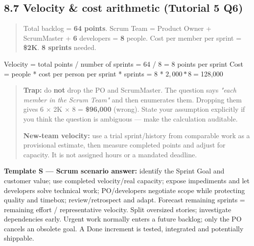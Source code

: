 \begin{studycolumns}
\vspace{0pt}

\subsection*{8.7 Velocity \& cost arithmetic (Tutorial 5 Q6)}

\begin{quote}\small\color{navy}
Total backlog = \textbf{64 points}. Scrum Team = Product Owner + ScrumMaster + \textbf{6} developers = \textbf{8} people. Cost per member per sprint = \textbf{\$2K}. \textbf{8 sprints} needed.

\end{quote}

\begin{ReferenceCode}
Velocity  = total points / number of sprints = 64 / 8 = 8 points per sprint
Cost      = people * cost per person per sprint * sprints
          = 8 * $2,000 * 8 = $128,000
\end{ReferenceCode}

\begin{quote}\small\color{navy}
\textbf{Trap:} do \textbf{not} drop the PO and ScrumMaster. The question says \emph{"each member in the Scrum Team"} and then enumerates them. Dropping them gives 6 \ensuremath{\times} 2K \ensuremath{\times} 8 = \textbf{\$96,000} (wrong). State your assumption explicitly if you think the question is ambiguous --- make the calculation auditable.

\textbf{New-team velocity:} use a trial sprint/\allowbreak{}history from comparable work as a provisional estimate, then measure completed points and adjust for capacity. It is not assigned hours or a mandated deadline.

\end{quote}


\par\needspace{65pt}\label{answer-scrum}
\textbf{Template S --- Scrum scenario answer:} identify the Sprint Goal and customer value; use completed velocity/\allowbreak{}real capacity; expose impediments and let developers solve technical work; PO/\allowbreak{}developers negotiate scope while protecting quality and timebox; review/\allowbreak{}retrospect and adapt. Forecast remaining sprints = remaining effort /\allowbreak{} representative velocity. Split oversized stories; investigate dependencies early. Urgent work normally enters a future backlog; only the PO cancels an obsolete goal. A Done increment is tested, integrated and potentially shippable.
\end{studycolumns}
